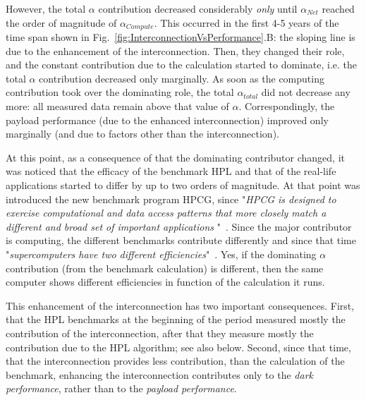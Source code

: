 {{However, the total $\alpha$ contribution decreased considerably \textit{only} until $\alpha_{Net}$ reached
the order of magnitude of  $\alpha_{Compute}$. 
This occurred in the first 4-5 years of the time span shown in Fig.~\ref{fig:InterconnectionVsPerformance}.B:
the sloping line is due to the 
enhancement of the interconnection.
Then, they changed their role, and the constant contribution due to the calculation started to dominate,
i.e. the total $\alpha$ contribution decreased only marginally.
As soon as the computing contribution took over the dominating role, the total  $\alpha_{total}$
did not decrease any more: all measured data remain above that value of  $\alpha$.
Correspondingly, the payload performance (due to the enhanced interconnection) improved only marginally (and due to factors other than the interconnection).

At this point, as a consequence of that  the dominating contributor changed, it was noticed that the efficacy of the benchmark \gls{HPL} and that of the real-life applications started to differ by up to two orders of magnitude.
At that point was introduced the new benchmark program \gls{HPCG}, since "\textit{\gls{HPCG} is designed to exercise computational and data access patterns that more closely match a different and broad set of important applications%
}"~\cite{HPCG_List:2016}.
Since the major contributor is computing, the different benchmarks contribute differently and since that time
"\textit{supercomputers have two different efficiencies}"~\cite{DifferentBenchmarks:2017}.
Yes, if the dominating $\alpha$ contribution (from the benchmark calculation) is different, then the same computer shows different efficiencies
in function of the calculation it runs.

This enhancement of the interconnection has two important consequences.
First, that the \gls{HPL} benchmarks
at the beginning of the period measured mostly the contribution of the interconnection, after that they measure mostly the contribution due to the \gls{HPL} algorithm; see also below.
Second, since that time, that the interconnection provides less contribution, than the calculation of the benchmark, enhancing the interconnection contributes only to the \textit{dark performance}, rather than to the \textit{payload performance}. 
}
}



